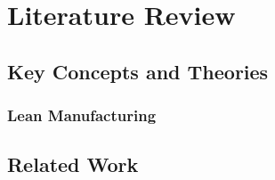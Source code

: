 \chapter{Literature Review}

\section{Key Concepts and Theories}
\lipsum[9] %

\subsection{Lean Manufacturing}
\lipsum[7] %

\section{Related Work}
\lipsum[10] %